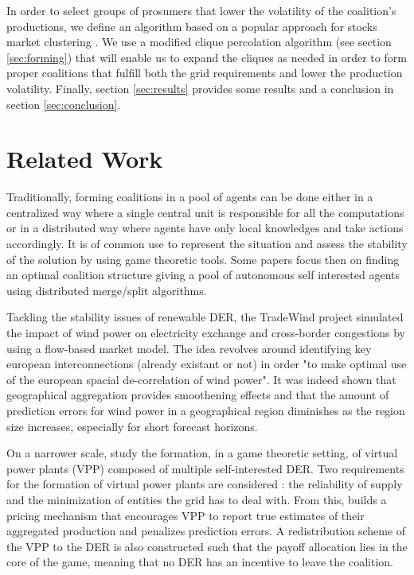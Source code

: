 \documentclass[conference]{IEEEtran}
\begin{document}
In order to select groups of prosumers that lower the volatility of the coalition's productions, we define an algorithm based on a popular approach for stocks market clustering \cite{Mantegna1999}. We use a modified clique percolation algorithm (see section \ref{sec:forming}) that will enable us to expand the cliques as needed in order to form proper coalitions that fulfill both the grid requirements and lower the production volatility. Finally, section \ref{sec:results} provides some results and a conclusion in section \ref{sec:conclusion}.

%
%

\section{Related Work}
\label{sec:related}

Traditionally, forming coalitions in a pool of agents can be done either in a centralized way where a single central unit is responsible for all the computations or in a distributed way where agents have only local knowledges and take actions accordingly. It is of common use to represent the situation and assess the stability of the solution by using game theoretic tools. Some papers \cite{Saad2009} \cite{Luan2014} focus then on finding an optimal coalition structure giving a pool of autonomous self interested agents using distributed merge/split algorithms.

Tackling the stability issues of renewable DER, the TradeWind project \cite{Europe} simulated the impact of wind power on electricity exchange and cross-border congestions by using a flow-based market model. The idea revolves around identifying key european interconnections (already existant or not) in order "to make optimal use of the european spacial de-correlation of wind power". It was indeed shown that geographical aggregation provides smoothening effects and that the amount of prediction errors for wind power in a geographical region diminishes as the region size increases, especially for short forecast horizons.

On a narrower scale, \cite{Kota2011} study the formation, in a game theoretic setting, of virtual power plants (VPP) composed of multiple self-interested DER. Two requirements for the formation of virtual power plants are considered : the reliability of supply and the minimization of entities the grid has to deal with. From this, \cite{Kota2011} builds a pricing mechanism that encourages VPP to report true estimates of their aggregated production and penalizes prediction errors. A redistribution scheme of the VPP to the DER is also constructed such that the payoff allocation lies in the core of the game, meaning that no DER has an incentive to leave the coalition.
\end{document}
